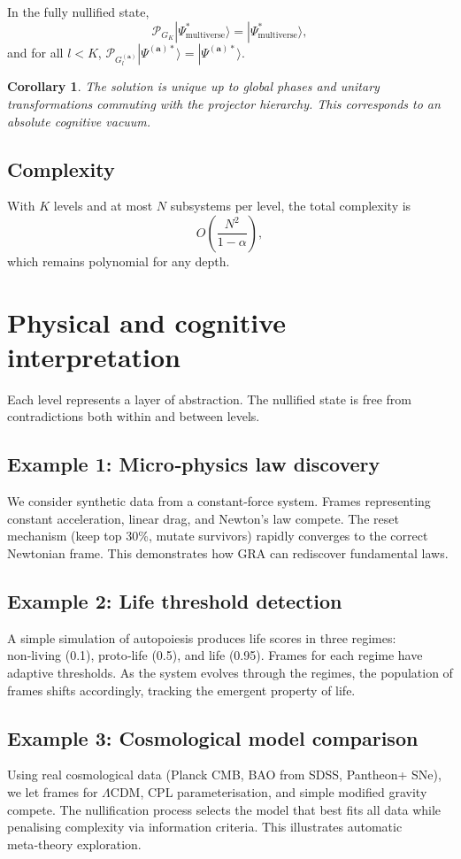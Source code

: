\documentclass[12pt]{article}
\newtheorem{corollary}{Corollary}
\theoremstyle{definition}
\begin{document}
In the fully nullified state,
\[
\mathcal{P}_{G_K} |\Psi_{\text{multiverse}}^*\rangle = |\Psi_{\text{multiverse}}^*\rangle,
\]
and for all \(l<K\), \(\mathcal{P}_{G_l^{(\mathbf{a})}} |\Psi^{(\mathbf{a})*}\rangle = |\Psi^{(\mathbf{a})*}\rangle\).

\begin{corollary}
The solution is unique up to global phases and unitary transformations commuting with the projector hierarchy. This corresponds to an \emph{absolute cognitive vacuum}.
\end{corollary}

\subsection{Complexity}
With \(K\) levels and at most \(N\) subsystems per level, the total complexity is
\[
O\left(\frac{N^2}{1-\alpha}\right),
\]
which remains polynomial for any depth.

\section{Physical and cognitive interpretation}
\label{sec:interpretation}

Each level represents a layer of abstraction. The nullified state is free from contradictions both within and between levels.

\subsection{Example 1: Micro‑physics law discovery}
We consider synthetic data from a constant‑force system. Frames representing constant acceleration, linear drag, and Newton’s law compete. The reset mechanism (keep top 30\%, mutate survivors) rapidly converges to the correct Newtonian frame. This demonstrates how GRA can rediscover fundamental laws.

\subsection{Example 2: Life threshold detection}
A simple simulation of autopoiesis produces life scores in three regimes: non‑living (0.1), proto‑life (0.5), and life (0.95). Frames for each regime have adaptive thresholds. As the system evolves through the regimes, the population of frames shifts accordingly, tracking the emergent property of life.

\subsection{Example 3: Cosmological model comparison}
Using real cosmological data (Planck CMB, BAO from SDSS, Pantheon+ SNe), we let frames for \(\Lambda\)CDM, CPL parameterisation, and simple modified gravity compete. The nullification process selects the model that best fits all data while penalising complexity via information criteria. This illustrates automatic meta‑theory exploration.
\end{document}

